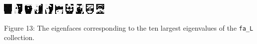 \documentclass[ 12pt ]{article}
\begin{document}
\begin{enumerate}
\begin{enumerate}
                \begin{center}
                    \includegraphics[scale=5]{AnyConv.com__largest1_2}
                    \includegraphics[scale=5]{AnyConv.com__largest2_2}
                    \includegraphics[scale=5]{AnyConv.com__largest3_2}
                    \includegraphics[scale=5]{AnyConv.com__largest4_2}
                    \includegraphics[scale=5]{AnyConv.com__largest5_2}
                    \includegraphics[scale=5]{AnyConv.com__largest6_2}
                    \includegraphics[scale=5]{AnyConv.com__largest7_2}
                    \includegraphics[scale=5]{AnyConv.com__largest8_2}
                    \includegraphics[scale=5]{AnyConv.com__largest9_2}
                    \includegraphics[scale=5]{AnyConv.com__largest10_2}
                \end{center}
                \begin{center}
                    \scriptsize
                    Figure 13: The eigenfaces corresponding to the ten largest eigenvalues of the \verb|fa_L| collection.
                \end{center}


\end{enumerate}
\end{enumerate}
\end{document}

